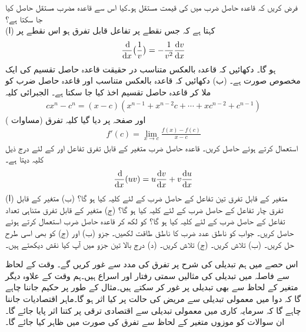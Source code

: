 فرض کریں کہ قاعدہ حاصل ضرب میں  کی قیمت مستقل  ہو۔کیا اس سے قاعدہ مضرب مستقل حاصل کیا جا سکتا ہے؟
\\
(ا)  کہتا ہے کہ جس نقطے پر تفاعل  قابل تفرق ہو اس نقطے پر 
\begin{align*}
\frac{\dif}{\dif x}\big(\frac{1}{v}\big)=-\frac{1}{v^2}\frac{\dif v}{\dif x}
\end{align*}
ہو گا۔ دکھائیں کہ قاعدہ بالعکس متناسب در حقیقت قاعدہ حاصل تقسیم کی ایک مخصوص صورت ہے۔ (ب) دکھائیں کہ قاعدہ بالعکس متناسب اور قاعدہ حاصل ضرب کو ملا کر قاعدہ حاصل تقسیم  اخذ کیا جا سکتا ہے۔
\quad
الجبرائی کلیہ
\begin{align*}
cx^n-c^n=(x-c)(x^{n-1}+x^{n-2}c+\cdots+xc^{n-2}+c^{n-1})
\end{align*}
اور صفحہ  پر دیا گیا کلیہ تفرق (مساوات )
\begin{align*}
f'(c)=\lim_{x\to c} \frac{f(x)-f(c)}{x-c}
\end{align*}
استعمال کرتے ہوئے  حاصل کریں۔
\quad
قاعدہ حاصل ضرب متغیر  کے قابل تفرق تفاعل  اور  کے لئے  درج ذیل کلیہ دیتا ہے۔
\begin{align*}
\frac{\dif}{\dif x}(uv)=u\frac{\dif v}{\dif x}+v\frac{\dif u}{\dif x}
\end{align*}
(ا) متغیر  کے قابل تفرق تین تفاعل کے حاصل ضرب  کے لئے کلیہ کیا ہو گا؟ (ب) متغیر  کے قابل تفرق چار تفاعل کے حاصل ضرب  کے لئے کلیہ کیا ہو گا؟ (ج) متغیر  کے قابل تفرق متناہی تعداد  تفاعل کے حاصل ضرب  کے لئے کلیہ کیا ہو گا؟
 کو  لکھ کر قاعدہ حاصل ضرب استعمال کرتے ہوئے  حاصل کریں۔ جواب کو ناطق عدد ضرب  کا ناطق طاقت لکھیں۔ جزو (ب) اور (ج) کو بھی اسی طرح حل کریں۔ (ب)  تلاش کریں۔ (ج)  تلاش کریں۔ (د) درج بالا تین جزو میں آپ کیا نقش دیکھتے ہیں۔

اس حصے میں ہم تبدیلی کی شرح پر تفرق کی مدد  سے غور کریں گے۔ وقت کے لحاظ سے فاصلہ میں تبدیلی کی مثالیں سمتی رفتار اور اسراع ہیں۔ہم وقت کے علاوہ دیگر متغیر کے لحاظ سے بھی تبدیلی پر غور کر سکتے ہیں۔مثال کے طور پر حکیم  جاننا چاہے گا کہ دوا میں معمولی تبدیلی سے مریض کی حالت پر کیا اثر ہو گا۔ماہر اقتصادیات  جاننا چاہے گا کہ سرمایہ کاری میں معمولی تبدیلی سے اقتصادی ترقی پر کتنا اثر پایا جائے گا۔ان سوالات کو موزوں متغیر کے لحاظ سے تفرق کی صورت میں ظاہر کیا جائے گا۔

